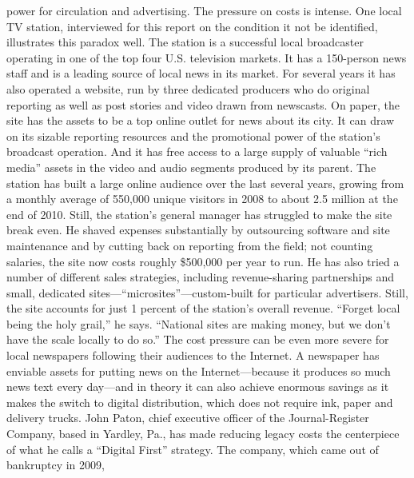 power for circulation and advertising. The pressure on costs is intense.
One local TV station, interviewed for this report on the condition it not be
identified, illustrates this paradox well. The station is a successful local broadcaster
operating in one of the top four U.S. television markets. It has a 150-person news
staff and is a leading source of local news in its market. For several years it has also
operated a website, run by three dedicated producers who do original reporting
as well as post stories and video drawn from newscasts.
On paper, the site has the assets to be a top online outlet for news about its city.
It can draw on its sizable reporting resources and the promotional power of the
station’s broadcast operation. And it has free access to a large supply of valuable
``rich media'' assets in the video and audio segments produced by its parent.
The station has built a large online audience over the last several years, growing
from a monthly average of 550,000 unique visitors in 2008 to about 2.5 million
at the end of 2010. Still, the station’s general manager has struggled to make the
site break even. He shaved expenses substantially by outsourcing software and
site maintenance and by cutting back on reporting from the field; not counting
salaries, the site now costs roughly \$500,000 per year to run. He has also tried a
number of different sales strategies, including revenue-sharing partnerships and
small, dedicated sites—``microsites''—custom-built for particular advertisers. Still,
the site accounts for just 1 percent of the station’s overall revenue. ``Forget local
being the holy grail,'' he says. ``National sites are making money, but we don’t
have the scale locally to do so.''
The cost pressure can be even more severe for local newspapers following their
audiences to the Internet. A newspaper has enviable assets for putting news on
the Internet—because it produces so much news text every day—and in theory
it can also achieve enormous savings as it makes the switch to digital distribution,
which does not require ink, paper and delivery trucks.
John Paton, chief executive officer of the Journal-Register Company, based in
Yardley, Pa., has made reducing legacy costs the centerpiece of what he calls a
``Digital First'' strategy. The company, which came out of bankruptcy in 2009,

